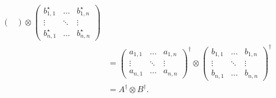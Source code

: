 \documentclass[10pt]{article}
\begin{document}
\begin{align*}
\begin{pmatrix}
\end{pmatrix}
\otimes
\begin{pmatrix}
b_{1, 1}^{\star} & \dots & b_{1, n}^{\star} \\
\vdots & \ddots & \vdots \\
b_{n, 1}^{\star} & \dots & b_{n, n}^{\star}
\end{pmatrix} \\
&=
 \begin{pmatrix}
a_{1, 1} & \dots & a_{1, n} \\
\vdots & \ddots & \vdots \\
a_{n, 1} & \dots & a_{n, n}
\end{pmatrix}^{\dag}
\otimes
\begin{pmatrix}
b_{1, 1} & \dots & b_{1, n} \\
\vdots & \ddots & \vdots \\
b_{n, 1} & \dots & b_{n, n}
\end{pmatrix}^{\dag} \\
&= A^{\dag} \otimes B^{\dag}.
\end{align*}
\end{document}
